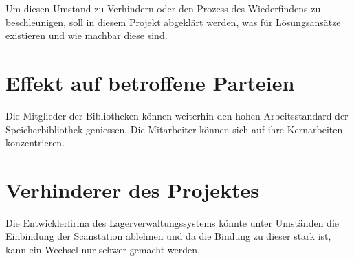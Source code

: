 Um diesen Umstand zu Verhindern oder den Prozess des Wiederfindens zu beschleunigen, soll in diesem Projekt abgeklärt werden, was für Lösungsansätze existieren und wie machbar diese sind.

\section{Effekt auf betroffene Parteien}
Die Mitglieder der Bibliotheken können weiterhin den hohen Arbeitsstandard der Speicherbibliothek geniessen.
Die Mitarbeiter können sich auf ihre Kernarbeiten konzentrieren.

\section{Verhinderer des Projektes}
Die Entwicklerfirma des Lagerverwaltungssystems könnte unter Umständen die Einbindung der Scanstation ablehnen und da die Bindung zu dieser stark ist, kann ein Wechsel nur schwer gemacht werden.
